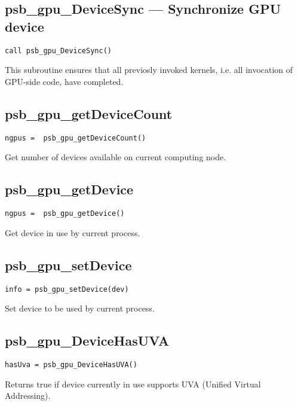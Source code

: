 \subsection*{psb\_gpu\_DeviceSync ---  Synchronize GPU device}

\begin{verbatim}
call psb_gpu_DeviceSync()
\end{verbatim}

This subroutine ensures that all previosly invoked kernels, i.e. all
invocation of GPU-side code, have completed.


\subsection*{psb\_gpu\_getDeviceCount }

\begin{verbatim}
ngpus =  psb_gpu_getDeviceCount()
\end{verbatim}

Get number of devices available on current computing node. 

\subsection*{psb\_gpu\_getDevice }

\begin{verbatim}
ngpus =  psb_gpu_getDevice()
\end{verbatim}

Get  device in use by current process. 

\subsection*{psb\_gpu\_setDevice }

\begin{verbatim}
info = psb_gpu_setDevice(dev)
\end{verbatim}

Set  device to be used  by current process. 

\subsection*{psb\_gpu\_DeviceHasUVA }

\begin{verbatim}
hasUva = psb_gpu_DeviceHasUVA()
\end{verbatim}

Returns true if device currently in use supports UVA (Unified Virtual Addressing).


